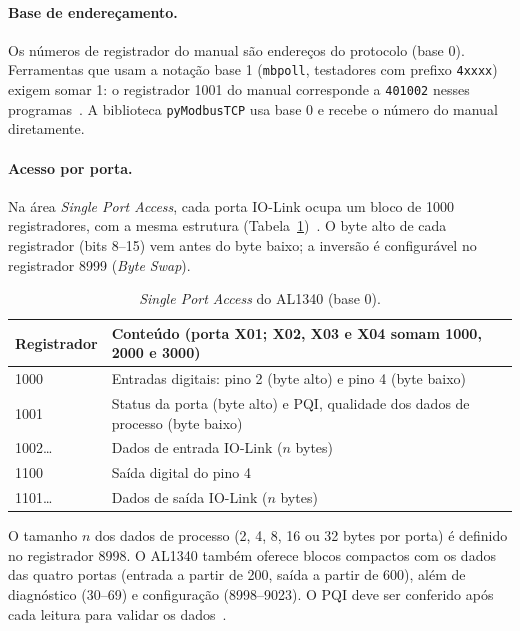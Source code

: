 \documentclass[11pt,a4paper]{article}
\newcommand{\code}[1]{\texttt{#1}}
\begin{document}
\paragraph{Base de endereçamento.} Os números de registrador do manual são
endereços do protocolo (base 0). Ferramentas que usam a notação base 1
(\code{mbpoll}, testadores com prefixo \code{4xxxx}) exigem somar 1: o
registrador 1001 do manual corresponde a \code{401002} nesses
programas~\cite{ifm-modbus-notes}. A biblioteca \code{pyModbusTCP} usa base 0
e recebe o número do manual diretamente.

\paragraph{Acesso por porta.} Na área \emph{Single Port Access}, cada porta
IO-Link ocupa um bloco de 1000 registradores, com a mesma estrutura
(Tabela~\ref{tab:spa})~\cite[seção 13.2.1]{ifm-al1340-manual}. O byte alto
de cada registrador (bits 8--15) vem antes do byte baixo; a inversão é
configurável no registrador 8999 (\emph{Byte Swap}).

\begin{table}[H]
\centering
\small
\begin{tabularx}{\textwidth}{@{}lX@{}}
\toprule
Registrador & Conteúdo (porta X01; X02, X03 e X04 somam 1000, 2000 e 3000) \\
\midrule
1000 & Entradas digitais: pino 2 (byte alto) e pino 4 (byte baixo) \\
1001 & Status da porta (byte alto) e PQI, qualidade dos dados de processo (byte baixo) \\
1002\ldots & Dados de entrada IO-Link ($n$ bytes) \\
1100 & Saída digital do pino 4 \\
1101\ldots & Dados de saída IO-Link ($n$ bytes) \\
\bottomrule
\end{tabularx}
\caption{\emph{Single Port Access} do AL1340 (base 0).}
\label{tab:spa}
\end{table}

O tamanho $n$ dos dados de processo (2, 4, 8, 16 ou 32 bytes por porta) é
definido no registrador 8998. O AL1340 também oferece blocos compactos com os
dados das quatro portas (entrada a partir de 200, saída a partir de 600),
além de diagnóstico (30--69) e configuração (8998--9023). O PQI deve ser
conferido após cada leitura para validar os dados~\cite[seção 9.3.12]{ifm-al1340-manual}.
\end{document}
